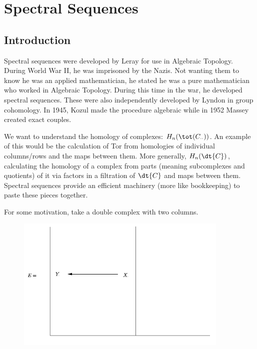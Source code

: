 
\newpage
\section{Spectral Sequences}
\subsection{Introduction}

Spectral sequences were developed by Leray for use in Algebraic Topology. During World War II, he was imprisoned by the Nazis. Not wanting them to know he was an applied mathematician, he stated he was a pure mathematician who worked in Algebraic Topology. During this time in the war, he developed spectral sequences. These were also independently developed by Lyndon in group cohomology. In 1945, Kozul made the procedure algebraic while in 1952 Massey created exact couples. 

We want to understand the homology of complexes: $H_n(\tot(C_{\cdot \cdot}))$. An example of this would be the calculation of Tor from homologies of individual columns/rows and the maps between them. More generally, $H_n(\dt{C})$, calculating the homology of a complex from parts (meaning subcomplexes and quotients) of it via factors in a filtration of $\dt{C}$ and maps between them. Spectral sequences provide an efficient machinery (more like bookkeeping) to paste these pieces together. 

For some motivation, take a double complex with two columns. 
\begin{figure}[h] 
   \centering
   \includegraphics[width=4in]{images/ex1.png} 
\end{figure}

